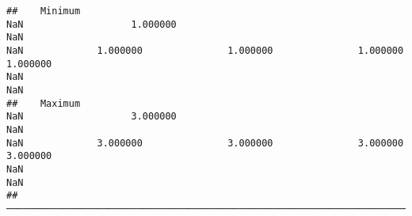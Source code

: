 \documentclass[
]{article}
\begin{document}
\begin{verbatim}
##    Minimum                                                                  NaN                   1.000000                                                                  NaN                                                                  NaN             1.000000               1.000000               1.000000               1.000000                                                                  NaN                                                                  NaN   
##    Maximum                                                                  NaN                   3.000000                                                                  NaN                                                                  NaN             3.000000               3.000000               3.000000               3.000000                                                                  NaN                                                                  NaN   
##  ─────────────────────────────────────────────────────────────────────────────────────────────────────────────────────────────────────────────────────────────────────────────────────────────────────────────────────────────────────────────────────────────────────────────────────────────────────────────────────────────────────────────────────────────────────────────────────────────────────────────────────────────────────────────────────────────────────────────────────────
\end{verbatim}
\end{document}
